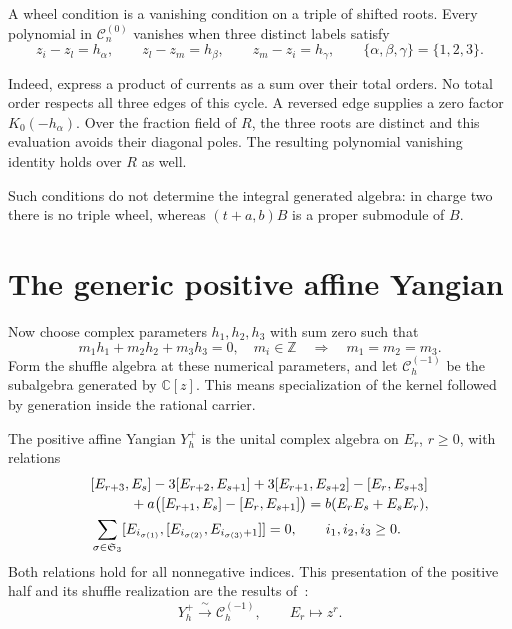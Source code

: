 A wheel condition is a vanishing condition on a triple of shifted
roots.  Every polynomial in $\mathcal C^{(0)}_n$ vanishes when three
distinct labels satisfy
\[
 z_i-z_l=h_\alpha,\qquad z_l-z_m=h_\beta,
 \qquad z_m-z_i=h_\gamma,
 \qquad \{\alpha,\beta,\gamma\}=\{1,2,3\}.
\]

Indeed, express a product of currents as a sum over their total
orders.  No total order respects all three edges of this cycle.
A reversed edge supplies a zero factor $K_0(-h_\alpha)$.
Over the fraction field of $R$, the three roots are distinct and
this evaluation avoids their diagonal poles.  The resulting
polynomial vanishing identity holds over $R$ as well.

Such conditions do not determine the integral generated algebra:
in charge two there is no triple wheel, whereas
$(t+a,b)B$ is a proper submodule of $B$.

\section{The generic positive affine Yangian}
Now choose complex parameters $h_1,h_2,h_3$ with sum zero such that
\[
 m_1h_1+m_2h_2+m_3h_3=0,\quad m_i\in\mathbb Z
 \quad\Longrightarrow\quad m_1=m_2=m_3.
\]
Form the shuffle algebra at these numerical parameters, and let
$\mathcal C^{(-1)}_h$ be the subalgebra generated by $\mathbb C[z]$.
This means specialization of the kernel followed by generation
inside the rational carrier.

The positive affine Yangian $Y_h^+$ is the unital complex algebra
on $E_r$, $r\geq0$, with relations
\begin{align}
 &[E_{r+3},E_s]-3[E_{r+2},E_{s+1}]
   +3[E_{r+1},E_{s+2}]-[E_r,E_{s+3}]
 \notag\\[-2pt]
 &\hspace{1cm}
   +a\bigl([E_{r+1},E_s]-[E_r,E_{s+1}]\bigr)
   =b(E_rE_s+E_sE_r),\label{cbc:l027:yangian-quadratic}\\
 &\sum_{\sigma\in\mathfrak S_3}
 [E_{i_{\sigma(1)}},[E_{i_{\sigma(2)}},E_{i_{\sigma(3)}+1}]]=0,
 \qquad i_1,i_2,i_3\geq0.\label{cbc:l027:yangian-serre}
\end{align}
Both relations hold for all nonnegative indices.
This presentation of the positive half and its shuffle realization
are the results of~\cite[Proposition~1.4(b), Theorem~7.6]{Tsymbaliuk}:
\begin{equation}\label{cbc:l027:yangian-map}
 Y_h^+\xrightarrow{\;\sim\;}\mathcal C^{(-1)}_h,
 \qquad E_r\longmapsto z^r.
\end{equation}

